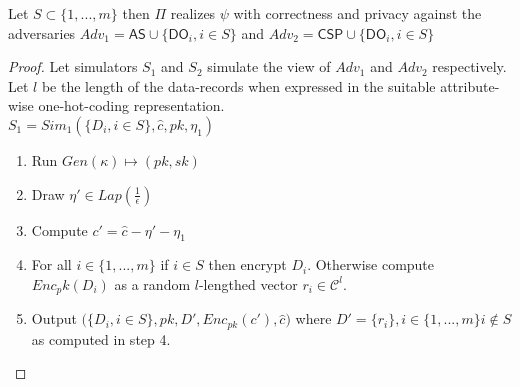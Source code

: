 \begin{theorem}Let $S \subset \{1,...,m\}$ then $\Pi$ realizes $\psi$  with correctness and privacy against
the adversaries $Adv_1=\textsf{AS} \cup \{\textsf{DO}_i, i \in S\}$  and $Adv_2=\textsf{CSP} \cup  \{ \textsf{DO}_i, i \in S\} $\end{theorem}
\begin{proof} \begin{comment}The interactions between the \textsf{AS} and the \textsf{CSP} can be categorized into three types \begin{enumerate}\item Yao's garbled circuits - Primitives: NoisyMax, CountDistinct\item Decryption of masked data - Primitives: GroupBy \item Decryption of differentially private output- Primitives: Laplace \end{enumerate} Thus there are three possibilities for protocol $\pi_2$. For the garbled circuit based protocol $\pi_2$, the output of both the primitives NoisyMax and CountDistinct are differentially private by definition.  Hence by the standard semantic security of garbled circuits \cite{Yao, yao2}, the protocol is secure against a P.P.T adversary revealing nothing other than the differentially private  circuit outputs. 
We will discuss the simulators for the other two cases as follows starting of with the second case, i.e., when the \textsf{CSP} decrypts masked data.
\end{comment}
Let simulators $S_1$ and $S_2$ simulate the view of ${Adv}_1$ and $Adv_2$ respectively. Let $l$ be the length of the data-records when expressed in the suitable attribute-wise one-hot-coding representation.\\
$S_1=Sim_1(\{D_i, i \in S\}, \hat{c}, pk, \eta_1)$
\begin{enumerate}\item Run $Gen(\kappa)\mapsto (pk,sk)$ 
\item Draw $\eta' \in Lap(\frac{1}{\epsilon})$
\item Compute $c'=\hat{c}-\eta'-\eta_1$
\item For all $i \in \{1,...,m\}$ if $i \in S$ then encrypt $D_i$. 
Otherwise compute $Enc_pk(D_i)$ as a random $l$-lengthed vector $r_i \in \mathcal{C}^l$.
\item Output $\Big(\{D_i, i \in S\},pk,D',Enc_{pk}(c'),\hat{c} \Big)$ where $D'=\{r_i\},i \in \{1,...,m\} i \not \in S$ as computed in step 4.
\end{enumerate}

\end{proof}

